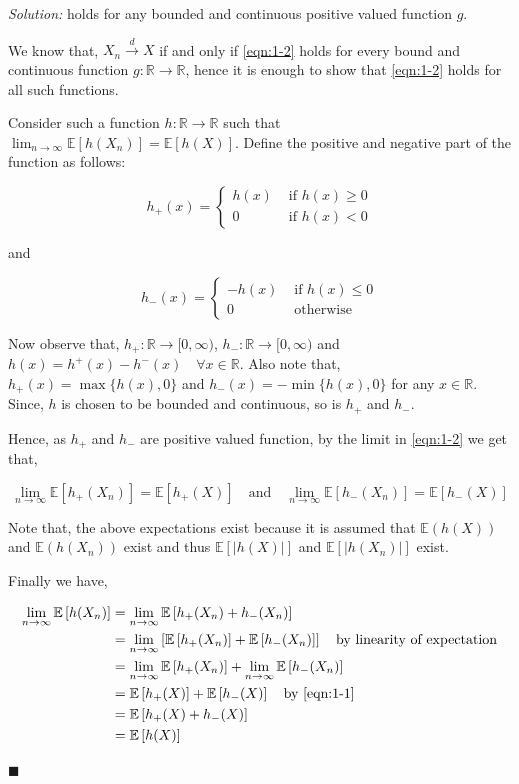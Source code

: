 \documentclass[12pt]{article}
\newcommand{\R}{\mathbb{R}}
\newcommand{\E}{\mathbb{E}}
\theoremstyle{definition}
\newenvironment{answer}{\textit{Solution: }\quad }{ \hfill $\blacksquare$}
\numberwithin{equation}{section}
\begin{document}
\begin{answer}
    holds for any bounded and continuous positive valued function $g$.
    

    We know that, $X_n \xrightarrow{d} X$ if and only if \cref{eqn:1-2} holds for every bound and continuous function $g : \R \rightarrow \R$, hence it is enough to show that \cref{eqn:1-2} holds for all such functions.


    Consider such a function $h : \R \rightarrow \R$ such that $\lim_{n\rightarrow\infty}\E\left[h(X_n)\right]=\E\left[h(X)\right]$. Define the positive and negative part of the function as follows:

    $$
    h_{+}(x) = \begin{cases}
        h(x) & \text{ if } h(x) \geq 0\\
        0 & \text{ if } h(x) < 0
    \end{cases}
    $$

    and 

    $$h_{-}(x)=\begin{cases}
        -h(x) & \text{ if } h(x)\leq 0\\
        0 & \text{ otherwise}
    \end{cases}
    $$
    
Now observe that, $h_{+} : \R \rightarrow [0, \infty)$, $h_{-} : \R \rightarrow [0, \infty)$ and $h(x)=h^+(x)-h^-(x)\quad \forall x\in\R$. Also note that, $h_{+}(x) = \max\{ h(x), 0 \}$ and $h_{-}(x) = -\min\{ h(x), 0 \}$ for any $x \in \R$. Since, $h$ is chosen to be bounded and continuous, so is $h_{+}$ and $h_{-}$.

Hence, as $h_{+}$ and $h_{-}$ are positive valued function, by the limit in \cref{eqn:1-2} we get that,

$$ 
\lim_{n\rightarrow\infty}\E\left[h_{+}(X_n)\right] = \E\left[h_{+}(X)\right]\quad \text{and} \quad \lim_{n\rightarrow\infty}\E\left[h_{-}(X_n)\right] = \E\left[h_{-}(X)\right]
$$

Note that, the above expectations exist because it is assumed that $\E(h(X))$ and $\E(h(X_n))$ exist and thus $\E[\vert h(X) \vert]$ and $\E[\vert h(X_n)\vert]$ exist.


Finally we have,

\begin{align*}
    \lim_{n\rightarrow\infty}\E\left[h(X_n)\right] 
    & = \lim_{n\rightarrow\infty}\E\left[h_{+}(X_n)+h_{-}(X_n)\right]\\
    & = \lim_{n\rightarrow\infty}\left[\E\left[h_{+}(X_n)\right]+ \E\left[h_{-}(X_n)\right] \right] \quad \text{by linearity of expectation}\\
    & = \lim_{n\rightarrow\infty}\E\left[h_{+}(X_n)\right]+\lim_{n\rightarrow\infty} \E\left[h_{-}(X_n)\right] \\
    & = \E\left[h_{+}(X)\right] + \E\left[h_{-}(X)\right] \quad \text{by } \cref{eqn:1-1}\\
    & = \E\left[h_{+}(X)+h_{-}(X)\right]\\
    & = \E\left[ h(X) \right]
\end{align*}


\end{answer}
\end{document}
